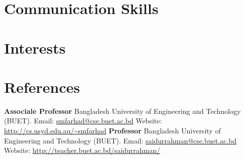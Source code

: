 \documentclass[11pt,a4paper,sans]{moderncv}
\begin{document}


\section{Communication Skills}



\section{Interests}

\renewcommand{\listitemsymbol}{-~} %

\section{References}
{
\textbf{Associale Professor\newline}
Bangladesh University of Engineering and Technology (BUET).\newline
Email: \url{smfarhad@cse.buet.ac.bd} \newline
Website: \url{http://cs.usyd.edu.au/~smfarhad}
}
{
\textbf{Professor\newline}
Bangladesh University of Engineering and Technology (BUET).\newline
Email: \url{saidurrahman@cse.buet.ac.bd} \newline
Website: \url{http://teacher.buet.ac.bd/saidurrahman/}
}
\end{document}
